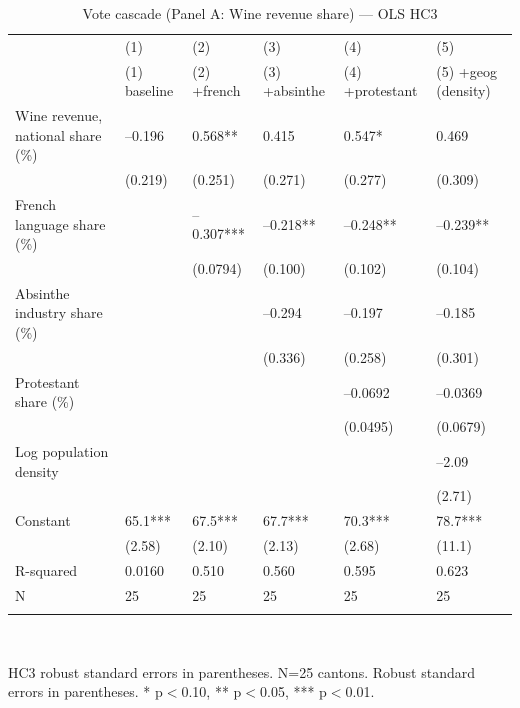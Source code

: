 \begin{table}[tbp] \centering
{}

\caption{Vote cascade (Panel A: Wine revenue share) --- OLS HC3}
\label{tab:T2_X3_OLS_test}
\begin{tabularx}{\linewidth}{@{}lCCCCC@{}}

\toprule
&{(1)}&{(2)}&{(3)}&{(4)}&{(5)} \tabularnewline
 & (1) baseline & (2) +french & (3) +absinthe & (4) +protestant & (5) +geog (density) \tabularnewline 
\midrule \addlinespace[\belowrulesep]
Wine revenue, national share (\%)&--0.196&0.568**&0.415&0.547*&0.469 \tabularnewline
&(0.219)&(0.251)&(0.271)&(0.277)&(0.309) \tabularnewline
French language share (\%)&&--0.307***&--0.218**&--0.248**&--0.239** \tabularnewline
&&(0.0794)&(0.100)&(0.102)&(0.104) \tabularnewline
Absinthe industry share (\%)&&&--0.294&--0.197&--0.185 \tabularnewline
&&&(0.336)&(0.258)&(0.301) \tabularnewline
Protestant share (\%)&&&&--0.0692&--0.0369 \tabularnewline
&&&&(0.0495)&(0.0679) \tabularnewline
Log population density&&&&&--2.09 \tabularnewline
&&&&&(2.71) \tabularnewline
Constant&65.1***&67.5***&67.7***&70.3***&78.7*** \tabularnewline
&(2.58)&(2.10)&(2.13)&(2.68)&(11.1) \tabularnewline
\midrule R-squared&0.0160&0.510&0.560&0.595&0.623 \tabularnewline
N&25&25&25&25&25 \tabularnewline
\bottomrule \addlinespace[\belowrulesep]

\end{tabularx}
\\ \parbox{\linewidth}{\footnotesize HC3 robust standard errors in parentheses. N=25 cantons. Robust standard errors in parentheses. * p\(<\)0.10, ** p\(<\)0.05, *** p\(<\)0.01.}
\end{table}
